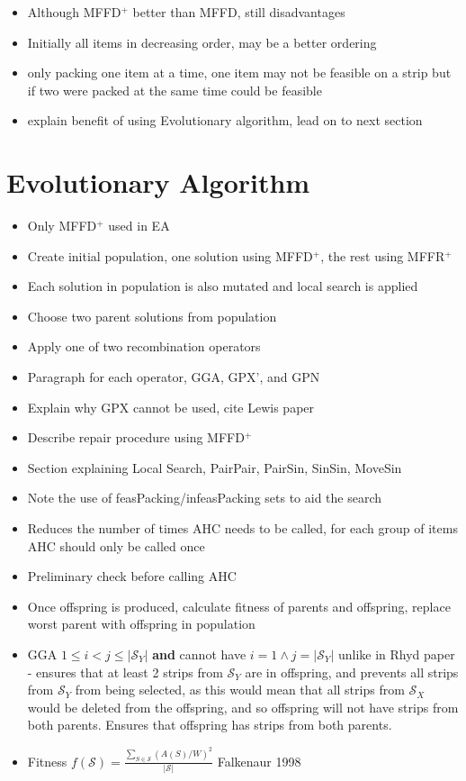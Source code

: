 \documentclass{elsarticle}
\begin{document}
\begin{itemize}
	\item Although MFFD$^+$ better than MFFD, still disadvantages
	\item Initially all items in decreasing order, may be a better ordering
	\item only packing one item at a time, one item may not be feasible on a strip but if two were packed at the same time could be feasible
	\item explain benefit of using Evolutionary algorithm, lead on to next section
\end{itemize}

\section{Evolutionary Algorithm}
\begin{itemize}
	\item Only MFFD$^+$ used in EA
	\item Create initial population, one solution using MFFD$^+$, the rest using MFFR$^+$
	\item Each solution in population is also mutated and local search is applied
	\item Choose two parent solutions from population
	\item Apply one of two recombination operators
	\item Paragraph for each operator, GGA, GPX', and GPN
	\item Explain why GPX cannot be used, cite Lewis paper
	\item Describe repair procedure using MFFD$^+$
	\item Section explaining Local Search, PairPair, PairSin, SinSin, MoveSin
	\item Note the use of feasPacking/infeasPacking sets to aid the search
	\item Reduces the number of times AHC needs to be called, for each group of items AHC should only be called once
	\item Preliminary check before calling AHC
	\item Once offspring is produced, calculate fitness of parents and offspring, replace worst parent with offspring in population
	\item GGA $1 \leq i < j \leq |\mathcal{S}_Y|$ \textbf{and} cannot have $i = 1 \land j = |\mathcal{S}_Y|$ unlike in Rhyd paper - ensures that at least 2 strips from $\mathcal{S}_Y$ are in offspring, and prevents all strips from $\mathcal{S}_Y$ from being selected, as this would mean that all strips from $\mathcal{S}_X$ would be deleted from the offspring, and so offspring will not have strips from both parents. Ensures that offspring has strips from both parents.
	\item Fitness $f(\mathcal{S}) = \frac{\sum_{S \in \mathcal{S}} (A(S)/W)^2}{|\mathcal{S}|}$ Falkenaur 1998
\end{itemize}
\end{document}
